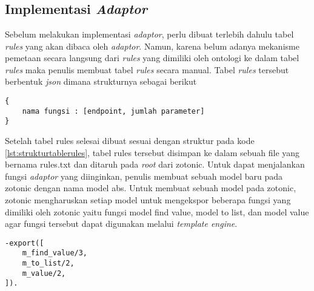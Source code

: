\chapter{\babEmpat}
\section{Implementasi \textit{Adaptor}}
Sebelum melakukan implementasi \textit{adaptor}, perlu dibuat terlebih dahulu tabel \textit{rules} yang akan dibaca oleh \textit{adaptor}. Namun, karena belum adanya mekanisme pemetaan secara langsung dari \textit{rules} yang dimiliki oleh ontologi ke dalam tabel \textit{rules} maka penulis membuat tabel \textit{rules} secara manual. Tabel \textit{rules} tersebut berbentuk \textit{json} dimana strukturnya sebagai berikut

\begin{minipage}{\linewidth}
\begin{lstlisting}[caption={Struktur tabel \textit{rules}},label={lst:strukturtablerules}]
{
	nama fungsi : [endpoint, jumlah parameter]
}
\end{lstlisting}
\end{minipage}

Setelah tabel rules selesai dibuat sesuai dengan struktur pada kode \ref{lst:strukturtablerules}, tabel rules tersebut disimpan ke dalam sebuah file yang bernama rules.txt dan ditaruh pada \textit{root} dari zotonic. Untuk dapat menjalankan fungsi \textit{adaptor} yang diinginkan, penulis membuat sebuah model baru pada zotonic dengan nama model abs. Untuk membuat sebuah model pada zotonic, zotonic mengharuskan setiap model untuk mengekspor beberapa fungsi yang dimiliki oleh zotonic yaitu fungsi model find value, model to list, dan model value agar fungsi tersebut dapat digunakan melalui \textit{template engine}.

\begin{minipage}{\linewidth}
\begin{lstlisting}[caption={Fungsi yang harus diekspor untuk model},label={lst:librarymodel}]
-export([
	m_find_value/3,
	m_to_list/2,
	m_value/2,
]).
\end{lstlisting}
\end{minipage}

